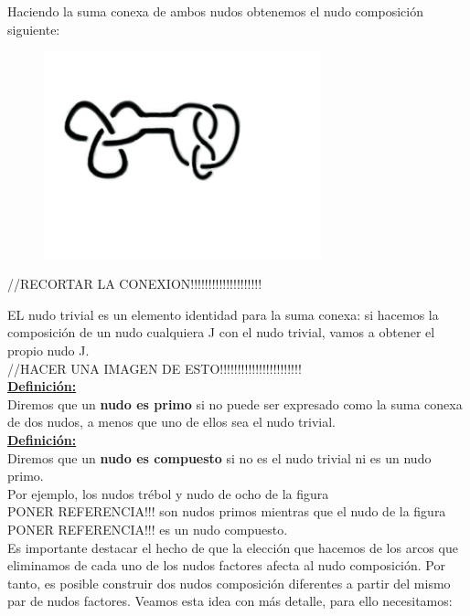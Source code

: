 \documentclass[14pt]{extarticle}
\begin{document}
Haciendo la suma conexa de ambos nudos obtenemos el nudo composición siguiente:
  \begin{figure}[h!]
  	\includegraphics[width=8cm]{conexion.jpg} 
  	\centering
  	\label{comp2} 
  \end{figure}
  
  //RECORTAR LA CONEXION!!!!!!!!!!!!!!!!!!!!
  
  EL nudo trivial es un elemento identidad para la suma conexa: si hacemos la composición de un nudo cualquiera J con el nudo trivial, vamos a obtener el propio nudo J. \\
  //HACER UNA IMAGEN DE ESTO!!!!!!!!!!!!!!!!!!!!!!!\\
  
 \underline{\textbf{ Definición:}}\\
 Diremos que un \textbf{nudo es primo} si no puede ser expresado como la suma conexa de dos nudos, a menos que uno de ellos sea el nudo trivial. \\
 
\underline{ \textbf{ Definición:}}\\
 Diremos que un \textbf{nudo es compuesto} si no es el nudo trivial ni es un nudo primo.\\
  
  Por ejemplo, los nudos trébol y nudo de ocho de la figura \\PONER REFERENCIA!!! son nudos primos mientras que el nudo de la figura \\PONER REFERENCIA!!! es un nudo compuesto. \\
  
    
    Es importante destacar el hecho de que la elección que hacemos de los arcos que eliminamos de cada uno de los nudos factores afecta al nudo composición. Por tanto, es posible construir dos nudos composición diferentes a partir del mismo par de nudos factores. Veamos esta idea con más detalle, para ello necesitamos:\\
    
\end{document}
